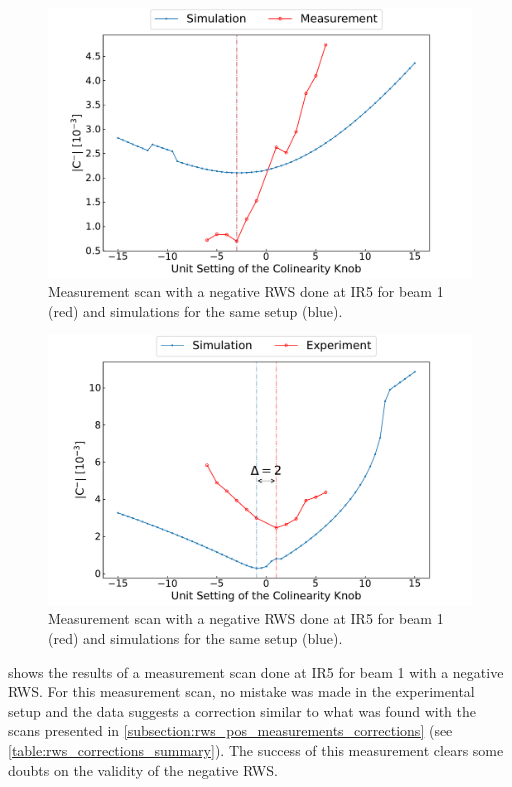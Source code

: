 \begin{figure}[!htb]
    \centering
    \includegraphics*[width=\textwidth]{Figures/Appendices/rws_measurement_ir5_b1_neg.pdf}
    \caption{Measurement scan with a negative RWS done at IR\num{5} for beam \num{1} (\textcolor{mplr}{red}) and simulations for the same setup (\textcolor{mplblue}{blue}).}
    \label{figure:ir5_b1_neg_measurement}
\end{figure}

\begin{figure}[!htb]
    \centering
    \includegraphics*[width=\textwidth]{Figures/Appendices/rws_measurement_ir5_b2_neg.pdf}
    \caption{Measurement scan with a negative RWS done at IR\num{5} for beam \num{1} (\textcolor{mplr}{red}) and simulations for the same setup (\textcolor{mplblue}{blue}).}
    \label{figure:ir5_b2_neg_measurement}
\end{figure}

 shows the results of a measurement scan done at IR\num{5} for beam \num{1} with a negative RWS.
For this measurement scan, no mistake was made in the experimental setup and the data suggests a correction similar to what was found with the scans presented in \cref{subsection:rws_pos_measurements_corrections} (see \cref{table:rws_corrections_summary}).
The success of this measurement clears some doubts on the validity of the negative \gls{RWS}.

